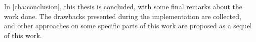 \paragraph{} ~\\
In \autoref{cha:conclusion}, this thesis is concluded, with some final remarks
about the work done. The drawbacks presented during the implementation are
collected, and other approaches on some specific parts of this work are proposed
as a sequel of this work.


